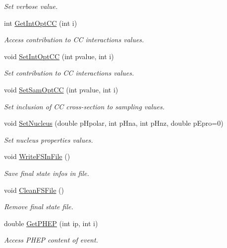 \begin{DoxyCompactItemize}
\begin{DoxyCompactList}\small\item\em Set verbose value. \end{DoxyCompactList}\item 
int \hyperlink{class_t_djangoh_a39b356c5689222e6c82172e9b4954fe1}{Get\+Int\+Opt\+CC} (int i)
\begin{DoxyCompactList}\small\item\em Access contribution to CC interactions values. \end{DoxyCompactList}\item 
void \hyperlink{class_t_djangoh_a7e37a7afc5c112a2bd061f5e73973f78}{Set\+Int\+Opt\+CC} (int pvalue, int i)
\begin{DoxyCompactList}\small\item\em Set contribution to CC interactions values. \end{DoxyCompactList}\item 
void \hyperlink{class_t_djangoh_acc7a3124293fe30c297fb7702bade781}{Set\+Sam\+Opt\+CC} (int pvalue, int i)
\begin{DoxyCompactList}\small\item\em Set inclusion of CC cross-\/section to sampling values. \end{DoxyCompactList}\item 
void \hyperlink{class_t_djangoh_ae37cb56d62427ac672155e0817f6849e}{Set\+Nucleus} (double p\+Hpolar, int p\+Hna, int p\+Hnz, double p\+Epro=0)
\begin{DoxyCompactList}\small\item\em Set nucleus properties values. \end{DoxyCompactList}\item 
void \hyperlink{class_t_djangoh_aa78f3a43ed71499a9efe9e87cc22d668}{Write\+F\+S\+In\+File} ()
\begin{DoxyCompactList}\small\item\em Save final state infos in file. \end{DoxyCompactList}\item 
void \hyperlink{class_t_djangoh_ade1e9ff8b29d2b95d24a22c3474a7ba6}{Clean\+F\+S\+File} ()
\begin{DoxyCompactList}\small\item\em Remove final state file. \end{DoxyCompactList}\item 
double \hyperlink{class_t_djangoh_acf17f3e8d6a10ebe25f57f75662a1817}{Get\+P\+H\+EP} (int ip, int i)
\begin{DoxyCompactList}\small\item\em Access P\+H\+EP content of event. \end{DoxyCompactList}\item 

\end{DoxyCompactItemize}
